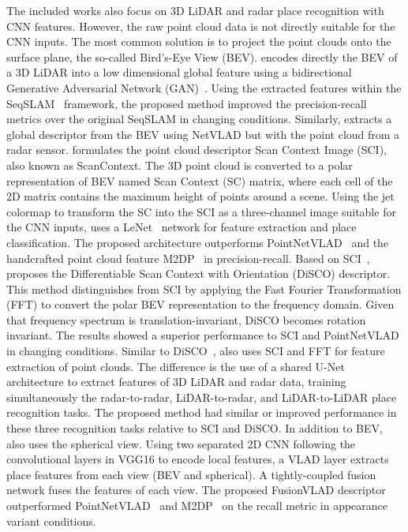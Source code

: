 The included works also focus on 3D LiDAR and radar place recognition with CNN features. However, the raw point cloud data is not directly suitable for the CNN inputs. The most common solution is to project the point clouds onto the surface plane, the so-called Bird's-Eye View (BEV).
\cite{yin-et-al:2018:8593562} encodes directly the BEV of a 3D LiDAR into a low dimensional global feature using a bidirectional Generative Adversarial Network (GAN)~\parencite{original:bigan}. Using the extracted features within the SeqSLAM~\parencite{discussion:seqslam} framework, the proposed method improved the precision-recall metrics over the original SeqSLAM in changing conditions.
Similarly, \cite{martini-et-al:2020:s20216002} extracts a global descriptor from the BEV using NetVLAD but with the point cloud from a radar sensor.
\cite{kim-et-al:2019:2897340} formulates the point cloud descriptor Scan Context Image (SCI), also known as ScanContext. The 3D point cloud is converted to a polar representation of BEV named Scan Context (SC) matrix, where each cell of the 2D matrix contains the maximum height of points around a scene. Using the jet colormap to transform the SC into the SCI as a three-channel image suitable for the CNN inputs, \cite{kim-et-al:2019:2897340} uses a LeNet~\parencite{original:lenet} network for feature extraction and place classification. The proposed architecture outperforms PointNetVLAD~\parencite{discussion:pointnetvlad} and the handcrafted point cloud feature M2DP~\parencite{discussion:m2dp} in precision-recall.
Based on SCI~\parencite{kim-et-al:2019:2897340}, \cite{xu-et-al:2021:3060741} proposes the Differentiable Scan Context with Orientation (DiSCO) descriptor. This method distinguishes from SCI by applying the Fast Fourier Transformation (FFT) to convert the polar BEV representation to the frequency domain. Given that frequency spectrum is translation-invariant, DiSCO becomes rotation invariant. The results showed a superior performance to SCI and PointNetVLAD in changing conditions.
Similar to DiSCO~\parencite{xu-et-al:2021:3060741}, \cite{yin-et-al:2021:661199} also uses SCI and FFT for feature extraction of point clouds. The difference is the use of a shared U-Net~\parencite{original:unet} architecture to extract features of 3D LiDAR and radar data, training simultaneously the radar-to-radar, LiDAR-to-radar, and LiDAR-to-LiDAR place recognition tasks. The proposed method had similar or improved performance in these three recognition tasks relative to SCI and DiSCO.
In addition to BEV, \cite{yin-et-al:2021:3061375} also uses the spherical view. Using two separated 2D CNN following the convolutional layers in VGG16 to encode local features, a VLAD layer extracts place features from each view (BEV and spherical). A tightly-coupled fusion network fuses the features of each view. The proposed FusionVLAD descriptor outperformed PointNetVLAD~\parencite{discussion:pointnetvlad} and M2DP~\parencite{discussion:m2dp} on the recall metric in appearance variant conditions.

